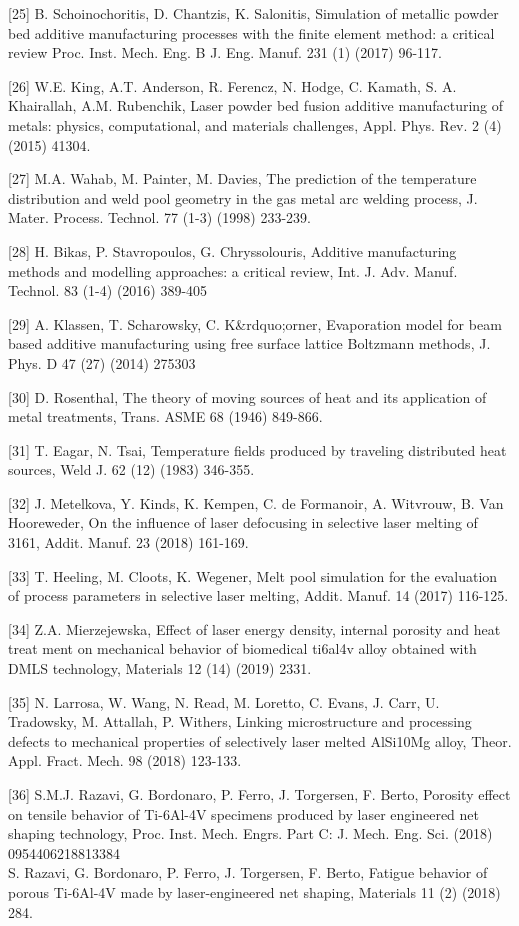 \documentclass[10pt]{article}
\begin{document}
[25] B. Schoinochoritis, D. Chantzis, K. Salonitis, Simulation of metallic powder bed additive manufacturing processes with the finite element method: a critical review Proc. Inst. Mech. Eng. B J. Eng. Manuf. 231 (1) (2017) 96-117.

[26] W.E. King, A.T. Anderson, R. Ferencz, N. Hodge, C. Kamath, S. A. Khairallah, A.M. Rubenchik, Laser powder bed fusion additive manufacturing of metals: physics, computational, and materials challenges, Appl. Phys. Rev. 2 (4) (2015) 41304.

[27] M.A. Wahab, M. Painter, M. Davies, The prediction of the temperature distribution and weld pool geometry in the gas metal arc welding process, J. Mater. Process. Technol. 77 (1-3) (1998) 233-239.

[28] H. Bikas, P. Stavropoulos, G. Chryssolouris, Additive manufacturing methods and modelling approaches: a critical review, Int. J. Adv. Manuf. Technol. 83 (1-4) (2016) 389-405

[29] A. Klassen, T. Scharowsky, C. K\&rdquo;orner, Evaporation model for beam based additive manufacturing using free surface lattice Boltzmann methods, J. Phys. D 47 (27) (2014) 275303

[30] D. Rosenthal, The theory of moving sources of heat and its application of metal treatments, Trans. ASME 68 (1946) 849-866.

[31] T. Eagar, N. Tsai, Temperature fields produced by traveling distributed heat sources, Weld J. 62 (12) (1983) 346-355.

[32] J. Metelkova, Y. Kinds, K. Kempen, C. de Formanoir, A. Witvrouw, B. Van Hooreweder, On the influence of laser defocusing in selective laser melting of 3161, Addit. Manuf. 23 (2018) 161-169.

[33] T. Heeling, M. Cloots, K. Wegener, Melt pool simulation for the evaluation of process parameters in selective laser melting, Addit. Manuf. 14 (2017) 116-125.

[34] Z.A. Mierzejewska, Effect of laser energy density, internal porosity and heat treat ment on mechanical behavior of biomedical ti6al4v alloy obtained with DMLS technology, Materials 12 (14) (2019) 2331.

[35] N. Larrosa, W. Wang, N. Read, M. Loretto, C. Evans, J. Carr, U. Tradowsky, M. Attallah, P. Withers, Linking microstructure and processing defects to mechanical properties of selectively laser melted AlSi10Mg alloy, Theor. Appl. Fract. Mech. 98 (2018) 123-133.

[36] S.M.J. Razavi, G. Bordonaro, P. Ferro, J. Torgersen, F. Berto, Porosity effect on tensile behavior of Ti-6Al-4V specimens produced by laser engineered net shaping technology, Proc. Inst. Mech. Engrs. Part C: J. Mech. Eng. Sci. (2018) 0954406218813384\\
[37] S. Razavi, G. Bordonaro, P. Ferro, J. Torgersen, F. Berto, Fatigue behavior of porous Ti-6Al-4V made by laser-engineered net shaping, Materials 11 (2) (2018) 284.
\end{document}
